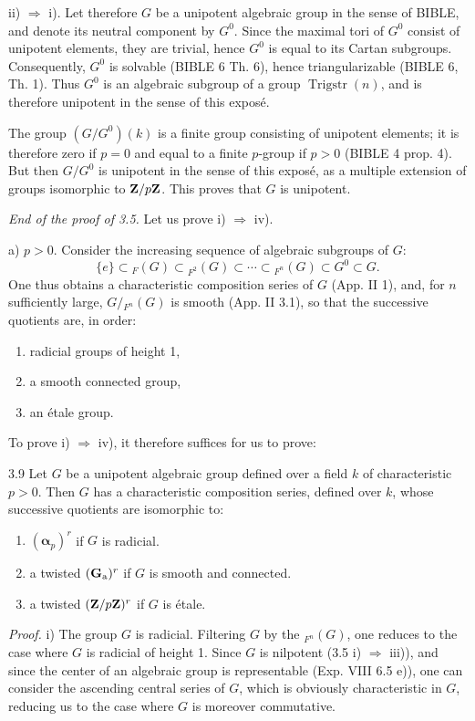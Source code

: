 \noindent ii) $\Rightarrow$ i). Let therefore $G$ be a unipotent algebraic group in the sense of BIBLE, and denote its neutral component by $G^0$. Since the maximal tori of $G^0$ consist of unipotent elements, they are trivial, hence $G^0$ is equal to its Cartan subgroups. Consequently, $G^0$ is solvable (BIBLE 6 Th. 6), hence triangularizable (BIBLE 6, Th. 1). Thus $G^0$ is an algebraic subgroup of a group $\operatorname{Trigstr}(n)$, and is therefore unipotent in the sense of this exposé.

The group $(G/G^0)(k)$ is a finite group consisting of unipotent elements; it is therefore zero if $p=0$ and equal to a finite $p$-group if $p>0$ (BIBLE 4 prop. 4). But then $G/G^0$ is unipotent in the sense of this exposé, as a multiple extension of groups isomorphic to $\mathbf{Z}/p\mathbf{Z}$. This proves that $G$ is unipotent.

\noindent\emph{End of the proof of 3.5.} Let us prove i) $\Rightarrow$ iv).

\noindent a) $p>0$. Consider the increasing sequence of algebraic subgroups of $G$:
\[
 \{e\}\subset{}_F(G)\subset{}_{F^2}(G)\subset\cdots
 \subset{}_{F^n}(G)\subset G^0\subset G.
\]
One thus obtains a characteristic composition series of $G$ (App. II 1), and, for $n$ sufficiently large, $G/{}_{F^n}(G)$ is smooth (App. II 3.1), so that the successive quotients are, in order:
\begin{enumerate}[label=\textup{(\arabic*)}]
\item radicial groups of height 1,
\item a smooth connected group,
\item an étale group.
\end{enumerate}
To prove i) $\Rightarrow$ iv), it therefore suffices for us to prove:
\begin{lemma}{3.9}\label{XVII.3.9}
Let $G$ be a unipotent algebraic group defined over a field $k$ of characteristic $p>0$. Then $G$ has a characteristic composition series, defined over $k$, whose successive quotients are isomorphic to:
\begin{enumerate}[label=\textup{\roman*)}]
\item $(\boldsymbol\alpha_p)^r$ if $G$ is radicial.
\item a twisted $(\mathbf{G}_{\mathrm{a}})^r$ if $G$ is smooth and connected.
\item a twisted $(\mathbf{Z}/p\mathbf{Z})^r$ if $G$ is étale.
\end{enumerate}
\end{lemma}
\noindent\emph{Proof.} i) The group $G$ is radicial. Filtering $G$ by the ${}_{F^n}(G)$, one reduces to the case where $G$ is radicial of height 1. Since $G$ is nilpotent (3.5 i) $\Rightarrow$ iii)), and since the center of an algebraic group is representable (Exp. VIII 6.5 e)), one can consider the ascending central series of $G$, which is obviously characteristic in $G$, reducing us to the case where $G$ is moreover commutative.

